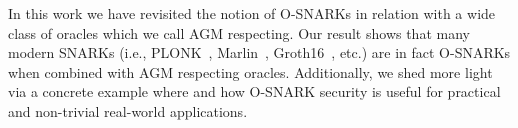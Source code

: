 In this work we have revisited the notion of O-SNARKs in relation with a wide class of oracles which we call AGM 
respecting. Our result shows that many modern SNARKs (i.e., PLONK~\cite{plonk}, Marlin~\cite{marlin}, Groth16~\cite{groth16}, etc.) 
are in fact O-SNARKs when combined with AGM respecting oracles. Additionally, we shed more light via a concrete 
example where and how O-SNARK security is useful for practical and non-trivial real-world applications. 

